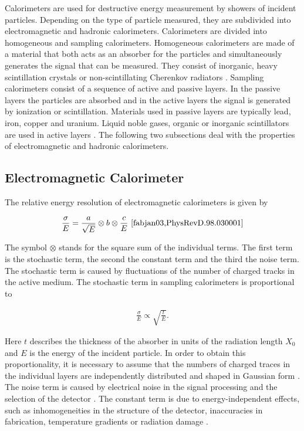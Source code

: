 \documentclass[12pt, a4paper]{thesis}
\begin{document}
Calorimeters are used for destructive energy measurement by showers of incident
particles. Depending on the type of particle measured, they are subdivided into
electromagnetic and hadronic calorimeters. Calorimeters are divided into
homogeneous and sampling calorimeters. Homogeneous calorimeters are made of a
material that both acts as an absorber for the particles and simultaneously
generates the signal that can be measured. They consist of inorganic, heavy
scintillation crystals or non-scintillating Cherenkov radiators
\cite{PhysRevD.98.030001}. Sampling calorimeters consist of a sequence of active
and passive layers. In the passive layers the particles are absorbed and in the
active layers the signal is generated by ionization or scintillation. Materials
used in passive layers are typically lead, iron, copper and uranium. Liquid
noble gases, organic or inorganic scintillators are used in active layers
\cite{PhysRevD.98.030001}. The following two subsections deal with the properties
of electromagnetic and hadronic calorimeters.

\subsection{Electromagnetic Calorimeter}
\label{sec:em-calo}

The relative energy resolution of electromagnetic calorimeters is
given by 

\begin{align}
\frac{\sigma}{E} = \frac{a}{\sqrt{E}} \otimes b \otimes \frac{c}{E}\ \cite{fabjan03,PhysRevD.98.030001}
\end{align}

The symbol \(\otimes\) stands for the square sum of the individual terms. The
first term is the stochastic term, the second the constant term and the third
the noise term.  The stochastic term is caused by fluctuations of the number of
charged tracks in the active medium. The stochastic term in sampling
calorimeters is proportional to

\begin{align}
\frac{\sigma}{E}\propto \sqrt{\frac{t}{E}}.
\end{align}

Here \(t\) describes the thickness of the absorber in units of the
radiation length \(X_0\) and \(E\) is the energy of the incident
particle. In order to obtain this proportionality, it is necessary to
assume that the numbers of charged traces in the individual layers are
independently distributed and shaped in Gaussian form \cite{amaldi81}. The
noise term is caused by electrical noise in the signal processing and
the selection of the detector \cite{fabjan03}. The constant term is due to
energy-independent effects, such as inhomogeneities in the structure
of the detector, inaccuracies in fabrication, temperature gradients or
radiation damage \cite{fabjan03}.
\end{document}
